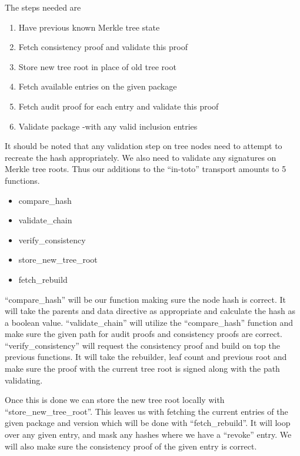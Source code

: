 \documentclass[../Main/thesis.tex]{subfiles}
\begin{document}
The steps needed are
\begin{enumerate}
    \item Have previous known Merkle tree state
    \item Fetch consistency proof and validate this proof
    \item Store new tree root in place of old tree root
    \item Fetch available entries on the given package
    \item Fetch audit proof for each entry and validate this proof
    \item Validate package -with any valid inclusion entries
\end{enumerate}

It should be noted that any validation step on tree nodes need to attempt to
recreate the hash appropriately. We also need to validate any signatures on
Merkle tree roots. Thus our additions to the ``in-toto'' transport amounts to 5
functions.

\begin{itemize}
    \item compare\_hash
    \item validate\_chain
    \item verify\_consistency
    \item store\_new\_tree\_root
    \item fetch\_rebuild
\end{itemize}

``compare\_hash'' will be our function making sure the node hash is correct. It
will take the parents and data directive as appropriate and calculate the hash
as a boolean value.  ``validate\_chain'' will utilize the ``compare\_hash''
function and make sure the given path for audit proofs and consistency proofs
are correct.  ``verify\_consistency'' will request the consistency proof and
build on top the previous functions. It will take the rebuilder, leaf count and
previous root and make sure the proof with the current tree root is signed along
with the path validating.

Once this is done we can store the new tree root locally with
``store\_new\_tree\_root''. This leaves us with fetching the current entries of
the given package and version which will be done with ``fetch\_rebuild''. It
will loop over any given entry, and mask any hashes where we have a ``revoke''
entry. We will also make sure the consistency proof of the given entry is
correct.
\end{document}
